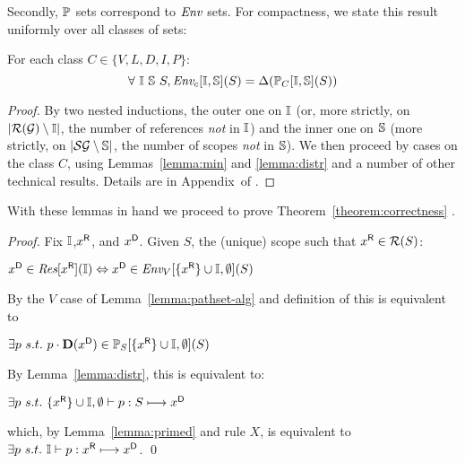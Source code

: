 \noindent
Secondly, $\mathbb{P}_{}$ sets correspond to $\mbox{\it{Env}}_{}$ sets. For compactness, we state this result
uniformly over all classes of sets:
\begin{lemma}
\label{lemma:pathset-alg}
For each class $C \in \{V,L,D,I,P\}$:\vspace*{-.3\baselineskip}
$$ \forall\ \mathbb{I}\ \mathbb{S}\ S, \mbox{\it{Env}}_{c}[\mathbb{I},\mathbb{S}](S) = \Delta(\mathbb{P}_{C}[\mathbb{I},\mathbb{S}](S))$$
\end{lemma}
\begin{proof}{By two nested inductions, 
the outer one on $\mathbb{I}$ (or, more strictly, on \mbox{$|\mathcal{R}(\mathcal{G}) \setminus \mathbb{I}|$}, the number of references
\emph{not} in $\mathbb{I}$) and the inner one on $\mathbb{S}$ (more strictly, on \mbox{$|\mathcal{S}{\mathcal{G}} \setminus \mathbb{S}|$}, the number of 
scopes \emph{not} in $\mathbb{S}$).  We then proceed by cases on the class $C$, using
Lemmas~\ref{lemma:min} and \ref{lemma:distr} and a number of other technical results. 
Details are in Appendix~ of \cite{TUD-SERG-2015-001-local}.}
\end{proof}

\noindent
With these lemmas in hand we proceed to prove Theorem~\ref{theorem:correctness} .
\begin{proof} Fix $\mathbb{I}$,${x}^{\mbox{\scriptsize\sf R}}$, and ${x}^{\mbox{\scriptsize\sf D}}$. Given $S$, the (unique) scope such that ${x}^{\mbox{\scriptsize\sf R}} \in \mathcal{R}(S)$:\smallskip\\
\centerline{${x}^{\mbox{\scriptsize\sf D}} \in \mbox{\it{Res}}[{x}^{\mbox{\scriptsize\sf R}}](\mathbb{I}) \Leftrightarrow {x}^{\mbox{\scriptsize\sf D}} \in \mbox{\it{Env}}_{V}[\{{x}^{\mbox{\scriptsize\sf R}}\} \cup \mathbb{I},\emptyset](S)$\smallskip}
By the $V$ case of Lemma~\ref{lemma:pathset-alg} and definition of  this is equivalent to\smallskip\\
\centerline{$\exists p\ s.t.\ p \cdot \mbox{\rm\bf{D}}({x}^{\mbox{\scriptsize\sf D}}) \in \mathbb{P}_{S}[\{{x}^{\mbox{\scriptsize\sf R}}\} \cup \mathbb{I},\emptyset](S)$\smallskip}
By Lemma~\ref{lemma:distr}, this is equivalent to:\smallskip\\
\centerline{$\exists p\ s.t.\ \{{x}^{\mbox{\scriptsize\sf R}}\} \cup \mathbb{I},\emptyset \vdash p : S \longmapsto {x}^{\mbox{\scriptsize\sf D}}$\smallskip}
which, by Lemma~\ref{lemma:primed} and rule $X$, is equivalent to $\exists p\ s.t.\ \mathbb{I} \vdash p : {x}^{\mbox{\scriptsize\sf R}} \longmapsto {x}^{\mbox{\scriptsize\sf D}}$. \qed 
\end{proof}



